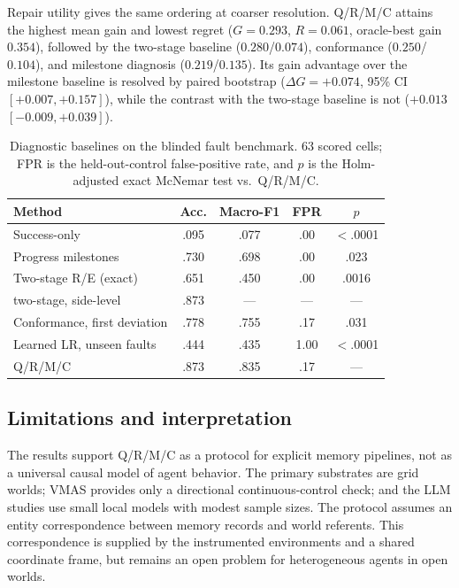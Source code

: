 \documentclass{article}
\begin{document}
Repair utility gives the same ordering at coarser resolution. Q/R/M/C attains the highest mean gain and lowest regret ($G=0.293$, $R=0.061$, oracle-best gain $0.354$), followed by the two-stage baseline ($0.280$/$0.074$), conformance ($0.250$/$0.104$), and milestone diagnosis ($0.219$/$0.135$). Its gain advantage over the milestone baseline is resolved by paired bootstrap ($\Delta G=+0.074$, 95\% CI $[+0.007,+0.157]$), while the contrast with the two-stage baseline is not ($+0.013$ $[-0.009,+0.039]$).

\begin{table}[t]
\caption{Diagnostic baselines on the blinded fault benchmark. 63
scored cells; FPR is the held-out-control false-positive rate, and
$p$ is the Holm-adjusted exact McNemar test vs.\ Q/R/M/C.}
\label{tab:baselines}
\centering
\small
\setlength{\tabcolsep}{4pt}
\begin{tabular}{lcccc}
\toprule
Method & Acc. & Macro-F1 & FPR & $p$ \\
\midrule
Success-only & .095 & .077 & .00 & $<$.0001 \\
Progress milestones & .730 & .698 & .00 & .023 \\
Two-stage R/E (exact) & .651 & .450 & .00 & .0016 \\
\quad two-stage, side-level & .873 & --- & --- & --- \\
Conformance, first deviation & .778 & .755 & .17 & .031 \\
Learned LR, unseen faults & .444 & .435 & 1.00 & $<$.0001 \\
Q/R/M/C & .873 & .835 & .17 & --- \\
\bottomrule
\end{tabular}
\end{table}

\subsection{Limitations and interpretation}

The results support Q/R/M/C as a protocol for explicit memory pipelines, not as a universal causal model of agent behavior. The primary substrates are grid worlds; VMAS provides only a directional continuous-control check; and the LLM studies use small local models with modest sample sizes. The protocol assumes an entity correspondence between memory records and world referents. This correspondence is supplied by the instrumented environments and a shared coordinate frame, but remains an open problem for heterogeneous agents in open worlds.
\end{document}
